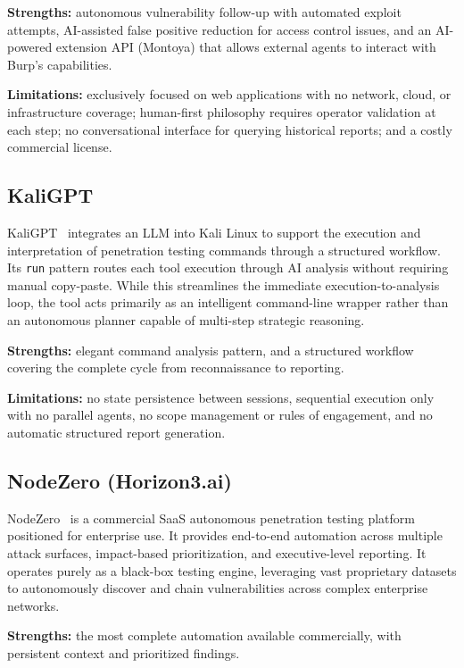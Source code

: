 \documentclass[12pt,a4paper]{report}
\begin{document}
\textbf{Strengths:} autonomous vulnerability follow-up with automated exploit
attempts, AI-assisted false positive reduction for access control issues, and an
AI-powered extension API (Montoya) that allows external agents to interact with
Burp's capabilities.

\textbf{Limitations:} exclusively focused on web applications with no network,
cloud, or infrastructure coverage; human-first philosophy requires operator
validation at each step; no conversational interface for querying historical
reports; and a costly commercial license.

\subsection{KaliGPT}

KaliGPT~\cite{kaligpt} integrates an LLM into Kali Linux to support the execution and
interpretation of penetration testing commands through a structured workflow. Its
\texttt{run} pattern routes each tool execution through AI analysis without requiring
manual copy-paste. While this streamlines the immediate execution-to-analysis loop, the tool acts primarily as an intelligent command-line wrapper rather than an autonomous planner capable of multi-step strategic reasoning.

\textbf{Strengths:} elegant command analysis pattern, and a structured workflow
covering the complete cycle from reconnaissance to reporting.

\textbf{Limitations:} no state persistence between sessions, sequential execution
only with no parallel agents, no scope management or rules of engagement, and no
automatic structured report generation.

\subsection{NodeZero (Horizon3.ai)}

NodeZero~\cite{nodezero} is a commercial SaaS autonomous penetration testing platform
positioned for enterprise use. It provides end-to-end automation across multiple
attack surfaces, impact-based prioritization, and executive-level reporting. It operates purely as a black-box testing engine, leveraging vast proprietary datasets to autonomously discover and chain vulnerabilities across complex enterprise networks.

\textbf{Strengths:} the most complete automation available commercially, with
persistent context and prioritized findings.
\end{document}
